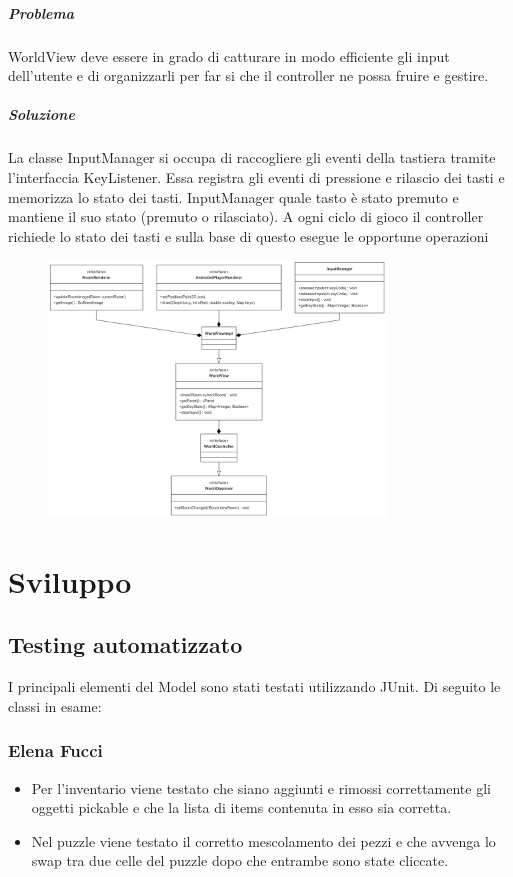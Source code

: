 \documentclass[a4paper,12pt]{report}
\begin{document}
\paragraph{Problema} %
WorldView deve essere in grado di catturare in modo efficiente gli input dell'utente e di organizzarli per far si che il controller ne possa fruire e gestire.
\paragraph{Soluzione} %
La classe InputManager si occupa di raccogliere gli eventi della tastiera tramite l'interfaccia KeyListener. Essa registra gli eventi di pressione e rilascio dei tasti e memorizza lo stato dei tasti. InputManager quale tasto è stato premuto e mantiene il suo stato (premuto o rilasciato). A ogni ciclo di gioco il controller richiede lo stato dei tasti e sulla base di questo esegue le opportune operazioni
\begin{figure} 
    \centering
    \includegraphics[width=0.8\textwidth]{img/WorldView.png}
    \label{img:WorldView}
\end{figure}

\chapter{Sviluppo}
\section{Testing automatizzato}
I principali elementi del Model sono stati testati utilizzando JUnit. Di seguito le classi in esame:

\subsection{Elena Fucci}
\begin{itemize}
	\item Per l’inventario viene testato che siano aggiunti e rimossi correttamente gli oggetti pickable e che la lista di items contenuta in esso sia corretta.
	\item Nel puzzle viene testato il corretto mescolamento dei pezzi e che avvenga lo swap tra due celle del puzzle dopo che entrambe sono state cliccate. 
\end{itemize}
\end{document}
